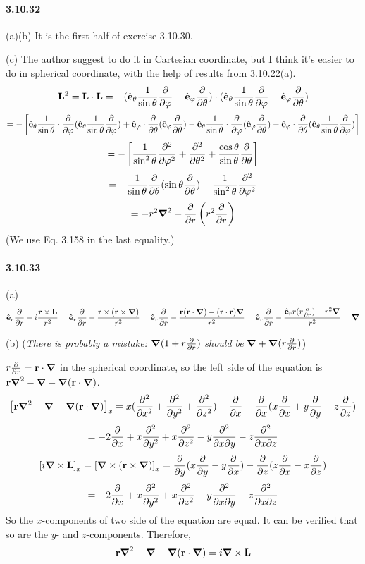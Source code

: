 \documentclass[a4paper]{article}
\begin{document}
\paragraph{3.10.32}
(a)(b) It is the first half of exercise 3.10.30.

(c) The author suggest to do it in Cartesian coordinate, but I think it's easier to do in spherical coordinate, with the help of results from 3.10.22(a).
\[
{\V{L}}^2=\V{L}\cdot\V{L}=-(\VE_\theta\frac{1}{\sin\theta}\pdv{}{\varphi}-\VE_\varphi\pdv{}{\theta})\cdot(\VE_\theta\frac{1}{\sin\theta}\pdv{}{\varphi}-\VE_\varphi\pdv{}{\theta})
\]
\[
=-\left[\VE_\theta\frac{1}{\sin\theta}\cdot\pdv{}{\varphi}(\VE_\theta\frac{1}{\sin\theta}\pdv{}{\varphi}) +\VE_\varphi\cdot\pdv{}{\theta}(\VE_\varphi\pdv{}{\theta})-\VE_\theta\frac{1}{\sin\theta}\cdot\pdv{}{\varphi}(\VE_\varphi\pdv{}{\theta})-\VE_\varphi\cdot\pdv{}{\theta}(\VE_\theta\frac{1}{\sin\theta}\pdv{}{\varphi})\right]
\]
\[
=-\left[\frac{1}{\sin^2\theta}\pdv{^2}{\varphi^2}+\pdv{^2}{\theta^2}+\frac{\cos\theta}{\sin\theta}\pdv{}{\theta} \right]
\]
\[
=-\frac{1}{\sin\theta}\pdv{}{\theta}(\sin\theta\pdv{}{\theta})-\frac{1}{\sin^2\theta}\pdv{^2}{\varphi^2}
\]
\[
=-r^2\del^2+\pdv{}{r}\left(r^2\pdv{}{r} \right)
\]
(We use Eq. 3.158 in the last equality.)

\paragraph{3.10.33}
(a) 
\[
\VE_r\pdv{}{r}-i\frac{\V{r}\times\V{L}}{r^2}=\VE_r\pdv{}{r}-\frac{\V{r}\times(\V{r}\times\del)}{r^2}=\VE_r\pdv{}{r}-\frac{\V{r}(\V{r}\cdot\del)-(\V{r}\cdot\V{r})\del}{r^2}=\VE_r\pdv{}{r}-\frac{\VE_r r(r\pdv{}{r})-r^2\del}{r^2}=\del
\]

(b) (\textit{There is probably a mistake:} $\del(1+r\pdv{}{r})$ \textit{should be} $\del+\del(r\pdv{}{r})$)
\smallskip

$r\pdv{}{r}=\V{r}\cdot\del$ in the spherical coordinate, so the left side of the equation is $\V{r}\del^2-\del-\del(\V{r}\cdot\del)$.
\[
\left[\V{r}\del^2-\del-\del(\V{r}\cdot\del) \right]_x=x(\pdv{^2}{x^2}+\pdv{^2}{y^2}+\pdv{^2}{z^2})-\pdv{}{x}-\pdv{}{x}(x\pdv{}{x}+y\pdv{}{y}+z\pdv{}{z})
\]
\[
=-2\pdv{}{x}+x\pdv{^2}{y^2}+x\pdv{^2}{z^2}-y\pdv{^2}{x\partial y}-z\pdv{^2}{x\partial z}
\]
\[
\left[i\del\times\V{L} \right]_x=\left[\del\times(\V{r}\times\del) \right]_x=\pdv{}{y}(x\pdv{}{y}-y\pdv{}{x})-\pdv{}{z}(z\pdv{}{x}-x\pdv{}{z})
\]
\[
=-2\pdv{}{x}+x\pdv{^2}{y^2}+x\pdv{^2}{z^2}-y\pdv{^2}{x\partial y}-z\pdv{^2}{x\partial z}
\]
So the $x$-components of two side of the equation are equal. It can be verified that so are the $y$- and $z$-components. Therefore,
\[
\V{r}\del^2-\del-\del(\V{r}\cdot\del)=i\del\times\V{L}
\]
\end{document}
